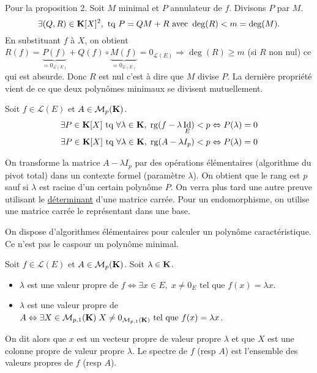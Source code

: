 \begin{demo}
  Pour la proposition 2. Soit $M$ minimal et $P$ annulateur de $f$. Divisons $P$ par $M$.
\[
  \exists (Q,R)\in \mathbf{K}[X]^2, \text{ tq } P = QM + R \text{ avec } \deg(R) < m = \deg(M). 
\]
En substituant $f$ à $X$, on obtient $R(f) = \underset{=0_{\mathcal{L}(E)}}{\underbrace{P(f)}} 
+ Q(f) \circ \underset{=0_{\mathcal{L}(E)}}{\underbrace{M(f)}} = 0_{\mathcal{L}(E)} \Rightarrow \deg(R) \geq m$ (si $R$ non nul) ce qui est absurde. Donc $R$ est nul c'est à dire que $M$ divise $P$.\newline
La dernière propriété vient de ce que deux polynômes minimaux se divisent mutuellement.
\end{demo}
\begin{propn}
  Soit $f \in \mathcal{L}(E)$ et $A \in \mathcal{M}_p(\mathbf{K})$.
\[
\begin{aligned}
  \exists P\in \mathbf{K}[X] \text{ tq } \forall \lambda \in \mathbf{K}, \; \mathop{\mathrm{rg}}(f - \lambda \mathop{\mathrm{Id}}_E) < p \Leftrightarrow P(\lambda) = 0 \\
  \exists P\in \mathbf{K}[X] \text{ tq } \forall \lambda \in \mathbf{K}, \; \mathop{\mathrm{rg}}(A - \lambda I_p) < p \Leftrightarrow P(\lambda) = 0
\end{aligned}
\]
\end{propn}
\begin{demo}
  On transforme la matrice $A - \lambda I_p$ par des opérations élémentaires (algorithme du pivot total) dans un contexte formel (paramètre $\lambda$). On obtient que le rang est $p$ sauf si $\lambda$ est racine d'un certain polynôme $P$.\newline
  On verra plus tard une autre preuve utilisant le \href{\baseurl C2261.pdf}{déterminant} d'une matrice carrée.\newline
  Pour un endomorphisme, on utilise une matrice carrée le représentant dans une base.
\end{demo}
\begin{rem}
  On dispose d'algorithmes élémentaires pour calculer un polynôme caractéristique. Ce n'est pas le caspour un polynôme minimal.
\end{rem}
\begin{defi}
  Soit $f \in \mathcal{L}(E)$ et $A \in \mathcal{M}_p(\mathbf{K})$. Soit $\lambda \in \mathbf{K}$.\medskip
  \begin{itemize}
    \item $\lambda$ est une valeur propre de $f \Leftrightarrow \exists x\in E,\; x\neq 0_E \text{ tel que } f(x)= \lambda x$.\medskip
    \item $\lambda$ est une valeur propre de $A \Leftrightarrow \exists X\in \mathcal{M}_{p ,1}(\mathbf{K}) \; X\neq 0_{\mathcal{M}_{p ,1}(\mathbf{K})} \text{ tel que } f(x)= \lambda x$.\medskip
  \end{itemize}
On dit alors que $x$ est un vecteur propre de valeur propre $\lambda$ et que $X$ est une colonne propre de valeur propre $\lambda$.\newline
Le spectre de $f$ (resp $A$) est l'ensemble des valeurs propres de $f$ (resp $A$).
\end{defi}
